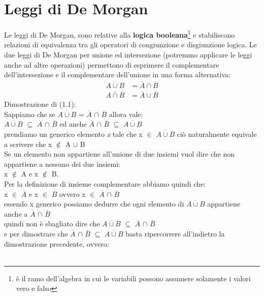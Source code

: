 \section{Leggi di De Morgan}

Le leggi di De Morgan, sono relative alla \textbf{logica booleana}\footnote{è il ramo dell'algebra in cui le variabili possono assumere solamente i valori vero e falso} e stabiliscono relazioni di equivalenza tra gli operatori di congiunzione e disgiunzione logica.
Le due leggi di De Morgan per unione ed intersezione (potremmo applicare le leggi anche ad altre operazioni) permettono di esprimere il complementare dell'intersezione e il complementare dell'unione in una forma alternativa:
\begin{align}
    \overline{A \cup B} &= \overline{A} \cap \overline{B} \\
    \overline{A \cap B} &= \overline{A} \cup \overline{B}
\end{align}
Dimostrazione di (1.1): \\
Sappiamo che se $\overline{A \cup B}$ = $\overline{A}$ $\cap$ $\overline{B}$ allora vale: \\
$\overline{A \cup B}$ $\subseteq$ $\overline{A}$ $\cap$ $\overline{B}$ ed anche $\overline{A}$ $\cap$ $\overline{B}$ $\subseteq$ $\overline{A \cup B}$ \\
prendiamo un generico elemento \textit{x} tale che x $\in$ $\overline{A \cup B}$ ciò naturalmente equivale a scrivere che x $\not \in$ A $\cup$ B \\
Se un elemento non appartiene all'unione di due insiemi vuol dire che non appartiene a nessuno dei due insiemi: \\
x $\not \in$ A e x $\not \in$ B. \\
Per la definizione di insieme complementare abbiamo quindi che: \\
x $\in$ $\overline{A}$ e x $\in$ $\overline{B}$ ovvero x $\in$ $\overline{A}$ $\cap$ $\overline{B}$ \\
essendo x generico possiamo dedurre che ogni elemento di $\overline{A \cup B}$ appartiene anche a $\overline{A}$ $\cap$ $\overline{B}$ \\
quindi non è sbagliato dire che $\overline{A \cup B}$ $\subseteq$ $\overline{A}$ $\cap$ $\overline{B}$ \\
e per dimostrare che $\overline{A}$ $\cap$ $\overline{B}$ $\subseteq$ $\overline{A \cup B}$ basta ripercorrere all'indietro la dimostrazione precedente, ovvero: \\ \\
